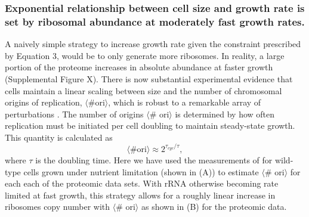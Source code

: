\subsubsection{Exponential relationship between cell size and growth rate is
set by ribosomal abundance at moderately fast growth rates.}

A naively simple strategy to increase growth rate given the constraint
prescribed by Equation 3, would be to only generate more ribosomes. In
reality, a large portion of the proteome increases in absolute abundance at faster growth
(Supplemental Figure X).  There is now substantial experimental evidence that
cells maintain a linear scaling between size and the number of chromosomal
origins of replication, $\langle\text{\# ori}\rangle$, which is robust to a
remarkable array of perturbations \citep{si2017}. The number of origins
$\langle$\# ori$\rangle$ is determined by how often replication must be
initiated per cell doubling to maintain steady-state growth. This quantity is
calculated as
\begin{equation}
    \langle \text{\# ori} \rangle \approx 2^{\tau_{cyc} / \tau},
\end{equation}
where $\tau$ is the doubling time. Here we have used the measurements of
\cite{si2017} for wild-type cells grown under nutrient limitation (shown in
(A)) to estimate $\langle$\# ori$\rangle$ for each
each of the  proteomic data sets.
With rRNA otherwise becoming rate limited at fast growth, this strategy allows for
a roughly linear increase in ribosomes copy number with $\langle$\# ori$\rangle$
as shown in (B) for the proteomic data.



